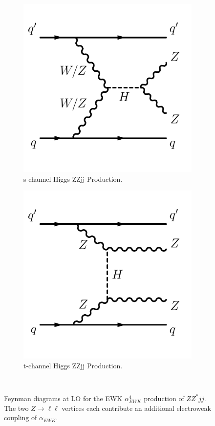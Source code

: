 \begin{figure}[!htb]
\begin{subfigure}{.48\textwidth}
  \label{fig:ZZjjFeynmanDiag_EWk_b}
\end{subfigure}
\begin{subfigure}{.48\textwidth}
  \centering
  \includegraphics[width=.8\linewidth]{figures/Theory/diagramEWZZjjSchnHiggs.pdf}  
  \caption{s-channel Higgs ZZjj Production.}
  \label{fig:ZZjjFeynmanDiag_EWk_c}
\end{subfigure}
\begin{subfigure}{.48\textwidth}
  \centering
  \includegraphics[width=.8\linewidth]{figures/Theory/diagramEWZZjjTchnHiggs.pdf}  
  \caption{t-channel Higgs ZZjj Production.}
  \label{fig:ZZjjFeynmanDiag_EWk_d}
\end{subfigure}\\
\caption{Feynman diagrams at LO for the EWK $\alpha_{EWK}^4$ production of $ZZ^*jj$. The two $Z\rightarrow \ell \ell$ vertices each contribute an additional electroweak coupling of $\alpha_{EWK}$. }
\label{fig:ZZjjFeynmanDiag_EWk}
\end{figure}

